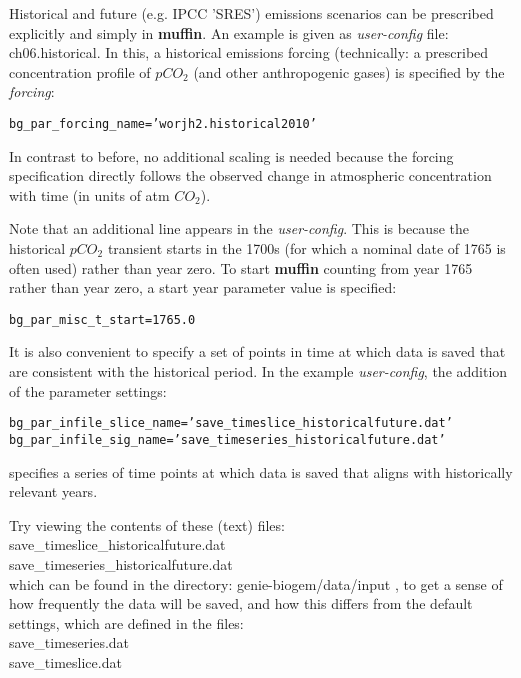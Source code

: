Historical and future (e.g. IPCC 'SRES') emissions scenarios can  be prescribed explicitly and simply in \textbf{muffin}. An example is given as \textit{user-config} file: \textsf{\footnotesize ch06.historical}. In this, a historical emissions forcing (technically: a prescribed concentration profile of \(pCO_{2}\) (and other anthropogenic gases) is specified by the \textit{forcing}:
\vspace{-2pt}\small\begin{verbatim}
bg_par_forcing_name=’worjh2.historical2010’
\end{verbatim}\normalsize\vspace{-2pt}
In contrast to before, no additional scaling is needed because the forcing specification directly follows the observed change in atmospheric concentration with time (in units of atm \(CO_{2}\)).

\vspace{1mm}

Note that an additional line appears in the \textit{user-config}. This is because the historical \(pCO_{2}\) transient starts in the 1700s (for which a nominal date of 1765 is often used) rather than year zero. To start \textbf{muffin} counting from year 1765 rather than year zero, a start year parameter value is specified:
\vspace{-2pt}\small\begin{verbatim}
bg_par_misc_t_start=1765.0
\end{verbatim}\normalsize\vspace{-2pt}
It is also convenient to specify a set of points in time at which data is saved that are consistent with the historical period. In the example \textit{user-config}, the addition of the parameter settings:
\vspace{-2pt}\small\begin{verbatim}
bg_par_infile_slice_name=’save_timeslice_historicalfuture.dat’
bg_par_infile_sig_name=’save_timeseries_historicalfuture.dat’
\end{verbatim}\normalsize\vspace{-2pt}
specifies a series of time points at which data is saved that aligns with historically relevant years.

Try viewing the contents of these (text) files:
\vspace{2pt}
\\ \footnotesize\textsf{save\_timeslice\_historicalfuture.dat }\normalsize
\\ \footnotesize\textsf{save\_timeseries\_historicalfuture.dat }\normalsize
\vspace{2pt}
\\which can be found in the directory: \footnotesize\textsf{genie-biogem/data/input }\normalsize, to get a sense of how frequently the data will be saved, and how this differs from the default settings, which are defined in the files:
\vspace{2pt}
\\ \footnotesize\textsf{save\_timeseries.dat }\normalsize
\\ \footnotesize\textsf{save\_timeslice.dat }\normalsize
\vspace{2pt}

